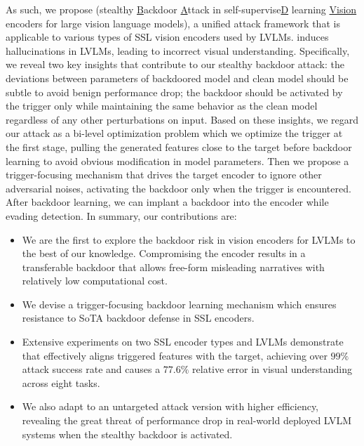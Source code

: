 As such, we propose \project (stealthy \underline{B}ackdoor \underline{A}ttack in self-supervise\underline{D} learning \underline{Vision} encoders for large vision language models), a unified attack framework that is applicable to various types of SSL vision encoders used by LVLMs. \project induces hallucinations in LVLMs, leading to incorrect visual understanding. 
Specifically, we reveal two key insights that contribute to our stealthy backdoor attack:  the deviations between parameters of backdoored model and clean model should be subtle to avoid benign performance drop;  the backdoor should be activated by the trigger only while maintaining the same behavior as the clean model regardless of any other perturbations on input. Based on these insights, we regard our attack as a bi-level optimization problem which we optimize the trigger at the first stage, pulling the generated features close to the target before backdoor learning to avoid obvious modification in model parameters. Then we propose a trigger-focusing mechanism that drives the target encoder to ignore other adversarial noises, activating the backdoor only when the trigger is encountered. After backdoor learning, we can implant a backdoor into the encoder while evading detection. In summary, our contributions are:
\begin{itemize}
    \item We are the first to explore the backdoor risk in vision encoders for LVLMs to the best of our knowledge. Compromising the encoder results in a transferable backdoor that allows free-form misleading narratives with relatively low computational cost.
    \item We devise a trigger-focusing backdoor learning mechanism which ensures resistance to SoTA backdoor defense in SSL encoders.
    \item Extensive experiments on two SSL encoder types and LVLMs demonstrate that \project effectively aligns triggered features with the target, achieving over $99\%$ attack success rate and causes a $77.6\%$ relative error in visual understanding across eight tasks.
    \item We also adapt \project to an untargeted attack version with higher efficiency, revealing the great threat of performance drop in real-world deployed LVLM systems when the stealthy backdoor is activated.
\end{itemize}